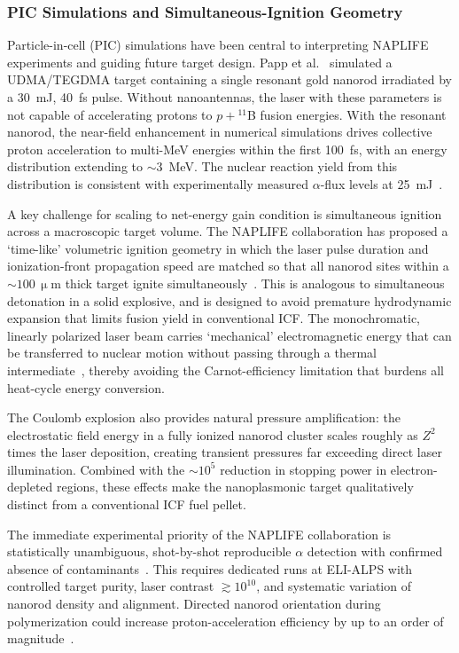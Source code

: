 \documentclass[particles,article,accept,pdftex,moreauthors]{Definitions/mdpi}
\begin{document}
\subsubsection{PIC Simulations and Simultaneous-Ignition Geometry}\label{sssec:NAPLIFE_PIC}
Particle-in-cell (PIC) simulations have been central to interpreting NAPLIFE experiments and guiding future target design. Papp et al.~\cite{Papp:2023arXiv} simulated a UDMA/TEGDMA target containing a single resonant gold nanorod irradiated by a 30~mJ, 40~fs pulse. Without nanoantennas, the laser with these parameters is not capable of accelerating protons to $p+{}^{11}$B fusion energies. With the resonant nanorod, the near-field enhancement in numerical simulations drives collective proton acceleration to multi-MeV energies within the first 100~fs, with an energy distribution extending to $\sim$3~MeV. The nuclear reaction yield from this distribution is consistent with experimentally measured $\alpha$-flux levels at 25~mJ~\cite{Kroo2024pB}.

A key challenge for scaling to net-energy gain condition is simultaneous ignition across a macroscopic target volume. The NAPLIFE collaboration has proposed a `time-like' volumetric ignition geometry in which the laser pulse duration and ionization-front propagation speed are matched so that all nanorod sites within a ${\sim}100\,\upmu$m thick target ignite simultaneously~\cite{Csernai:2025EPJ,Biro:2025EPJ}. This is analogous to simultaneous detonation in a solid explosive, and is designed to avoid premature hydrodynamic expansion that limits fusion yield in conventional ICF. The monochromatic, linearly polarized laser beam carries `mechanical' electromagnetic energy that can be transferred to nuclear motion without passing through a thermal intermediate~\cite{Csernai:2025EPJ}, thereby avoiding the Carnot-efficiency limitation that burdens all heat-cycle energy conversion.

The Coulomb explosion also provides natural pressure amplification: the electrostatic field energy in a fully ionized nanorod cluster scales roughly as $Z^2$ times the laser deposition, creating transient pressures far exceeding direct laser illumination. Combined with the ${\sim}10^5$ reduction in stopping power in electron-depleted regions, these effects make the nanoplasmonic target qualitatively distinct from a conventional ICF fuel pellet.

The immediate experimental priority of the NAPLIFE collaboration is statistically unambiguous, shot-by-shot reproducible $\alpha$ detection with confirmed absence of contaminants~\cite{mcnamee2025contaminant}. This requires dedicated runs at ELI-ALPS with controlled target purity, laser contrast $\gtrsim 10^{10}$, and systematic variation of nanorod density and alignment. Directed nanorod orientation during polymerization could increase proton-acceleration efficiency by up to an order of magnitude~\cite{Kedves:2025EPJ}.
\end{document}
